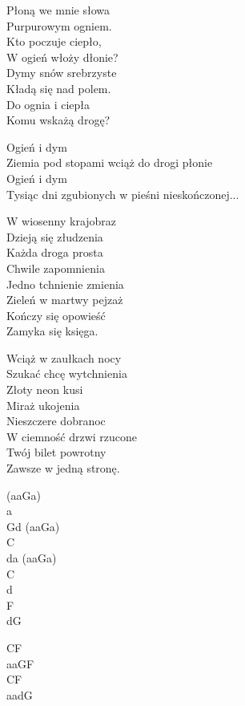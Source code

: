 \begin{text}
\hfill\break
Płoną we mnie słowa\\
Purpurowym ogniem.\\
Kto poczuje ciepło,\\
W ogień włoży dłonie?\\
Dymy snów srebrzyste\\
Kładą się nad polem.\\
Do ognia i ciepła\\
Komu wskażą drogę?

Ogień i dym\\
Ziemia pod stopami wciąż do drogi płonie\\
Ogień i dym\\
Tysiąc dni zgubionych w pieśni nieskończonej...

W wiosenny krajobraz\\
Dzieją się złudzenia\\
Każda droga prosta\\
Chwile zapomnienia\\
Jedno tchnienie zmienia\\
Zieleń w martwy pejzaż\\
Kończy się opowieść\\
Zamyka się księga.

Wciąż w zaułkach nocy\\
Szukać chcę wytchnienia\\
Złoty neon kusi\\
Miraż ukojenia\\
Nieszczere dobranoc\\
W ciemność drzwi rzucone\\
Twój bilet powrotny\\
Zawsze w jedną stronę.
\end{text}
\begin{chord}
(aaGa)\\
a\\
Gd (aaGa)\\
C\\
da (aaGa)\\
C\\
d\\
F\\
dG

CF\\
aaGF\\
CF\\
aadG
\end{chord}